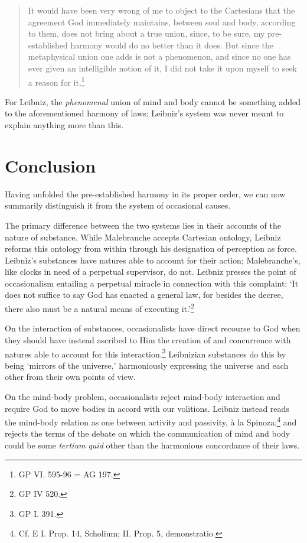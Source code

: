 \documentclass{article}
\begin{document}
\begin{quote}
It would have been very wrong of me to object to the Cartesians that the
agreement God immediately maintains, between soul and body, according to
them, does not bring about a true union, since, to be sure, my
pre-established harmony would do no better than it does. But since the
metaphysical union one adds is not a phenomenon, and since no one has
ever given an intelligible notion of it, I did not take it upon myself
to seek a reason for it.\footnote{GP VI. 595-96 = AG 197.}
\end{quote}

For Leibniz, the \emph{phenomenal} union of mind and body cannot be
something added to the aforementioned harmony of laws; Leibniz's system
was never meant to explain anything more than this.

\section{Conclusion}

Having unfolded the pre-established harmony in its proper order, we can
now summarily distinguish it from the system of occasional causes.

The primary difference between the two systems lies in their accounts of
the nature of substance. While Malebranche accepts Cartesian ontology,
Leibniz reforms this ontology from within through his designation of
perception as force. Leibniz's substances have natures able to account
for their action; Malebranche's, like clocks in need of a perpetual
supervisor, do not. Leibniz presses the point of occasionalism entailing
a perpetual miracle in connection with this complaint: `It does not
suffice to say God has enacted a general law, for besides the decree,
there also must be a natural means of executing it.'\footnote{GP IV 520.}

On the interaction of substances, occasionalists have direct recourse to
God when they should have instead ascribed to Him the creation of and
concurrence with natures able to account for this interaction.\footnote{GP
  I. 391.} Leibnizian substances do this by being `mirrors of the
universe,' harmoniously expressing the universe and each other from
their own points of view.

On the mind-body problem, occasionalists reject mind-body interaction
and require God to move bodies in accord with our volitions. Leibniz
instead reads the mind-body relation as one between activity and
passivity, à la Spinoza;\footnote{Cf. E I. Prop. 14, Scholium; II. Prop.
  5, demonstratio.} and rejects the terms of the debate on which the
communication of mind and body could be some \emph{tertium quid} other
than the harmonious concordance of their laws.
\end{document}
